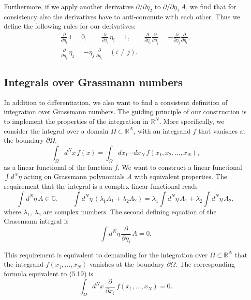 Furthermore, if we apply another derivative $\partial/\partial\eta_2$ to $\partial/\partial\eta_1\,A$, we find that for
consistency also the derivatives have to anti-commute with each other. Thus
we define the following rules for our derivatives:
\begin{equation}
  \begin{aligned}
    \frac{\partial}{\partial\eta_i}\,1 = 0, \qquad
    \frac{\partial}{\partial\eta_i}\,\eta_i = 1, \qquad
    \frac{\partial}{\partial\eta_i}\frac{\partial}{\partial\eta_j}
      = -\frac{\partial}{\partial\eta_j}\frac{\partial}{\partial\eta_i}, \\
    \frac{\partial}{\partial\eta_i}\,\eta_j = -\eta_j\,\frac{\partial}{\partial\eta_i}
    \quad (i \neq j) .
  \end{aligned}
\end{equation}

\subsection{Integrals over Grassmann numbers}

In addition to differentiation, we also want to find a consistent definition of
integration over Grassmann numbers. The guiding principle of our construction is to implement the properties of the integration in $\mathbb{R}^N$. More specifically,
we consider the integral over a domain $\Omega \subset \mathbb{R}^N$, with an integrand $f$ that
vanishes at the boundary $\partial\Omega$,
\begin{equation}
  \int_{\Omega}d^Nx\,f(x) =
  \int_{\Omega}dx_1\cdots dx_N\,f(x_1, x_2, \ldots, x_N) ,
\end{equation}
as a linear functional of the function $f$. We want to construct a linear functional $\int d^N\eta$ acting on Grassmann polynomials $A$ with equivalent properties.
The requirement that the integral is a complex linear functional reads
\begin{equation}
  \int d^N\eta\,A \in \mathbb{C}, \qquad
  \int d^N\eta\,(\lambda_1 A_1 + \lambda_2 A_2)
  = \lambda_1\int d^N\eta\,A_1 + \lambda_2\int d^N\eta\,A_2 ,
\end{equation}
where $\lambda_1$, $\lambda_2$ are complex numbers. The second defining equation of the Grassmann integral is
\begin{equation}
  \int d^N\eta\,\frac{\partial}{\partial\eta_i}\,A = 0 .
\end{equation}

This requirement is equivalent to demanding for the integration over $\Omega \subset \mathbb{R}^N$
that the integrand $f(x_1, \ldots, x_N)$ vanishes at the boundary $\partial\Omega$. The corresponding formula equivalent to (5.19) is
\begin{equation}
  \int_{\Omega}d^Nx\,\frac{\partial}{\partial x_i}\,f(x_1, \ldots, x_N) = 0 .
\end{equation}

